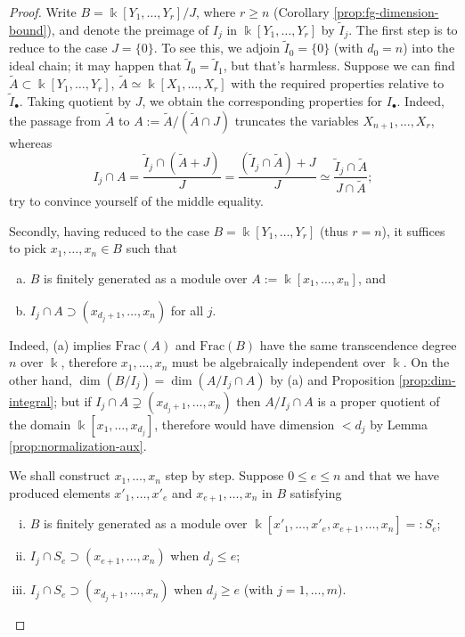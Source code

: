 \begin{proof}
	Write $B = \Bbbk[Y_1, \ldots, Y_r]/J$, where $r \geq n$ (Corollary \ref{prop:fg-dimension-bound}), and denote the preimage of $I_j$ in $\Bbbk[Y_1, \ldots, Y_r]$ by $\tilde{I}_j$. The first step is to reduce to the case $J=\{0\}$. To see this, we adjoin $\tilde{I}_0 = \{0\}$ (with $d_0 = n$) into the ideal chain; it may happen that $\tilde{I}_0 = \tilde{I}_1$, but that's harmless. Suppose we can find $\tilde{A} \subset \Bbbk[Y_1, \ldots, Y_r]$, $\tilde{A} \simeq \Bbbk[X_1, \ldots, X_r]$ with the required properties relative to $\tilde{I}_\bullet$. Taking quotient by $J$, we obtain the corresponding properties for $I_\bullet$. Indeed, the passage from $\tilde{A}$ to $A := \tilde{A}/(\tilde{A} \cap J)$ truncates the variables $X_{n + 1}, \ldots, X_r$, whereas
	\[ I_j \cap A = \frac{\tilde{I}_j \cap (\tilde{A} + J)}{J} = \frac{(\tilde{I}_j \cap \tilde{A}) + J}{J}  \simeq \frac{\tilde{I}_j \cap \tilde{A}}{J \cap \tilde{A}}; \]
	try to convince yourself of the middle equality.

	Secondly, having reduced to the case $B = \Bbbk[Y_1, \ldots, Y_r]$ (thus $r = n$), it suffices to pick $x_1, \ldots, x_n \in B$ such that
	\begin{enumerate}[(a)]
		\item $B$ is finitely generated as a module over $A := \Bbbk[x_1, \ldots, x_n]$, and
		\item $I_j \cap A \supset (x_{d_j+1}, \ldots, x_n)$ for all $j$.
	\end{enumerate}
	Indeed, (a) implies $\mathrm{Frac}(A)$ and $\mathrm{Frac}(B)$ have the same transcendence degree $n$ over $\Bbbk$, therefore $x_1, \ldots, x_n$ must be algebraically independent over $\Bbbk$. On the other hand, $\dim(B/I_j) = \dim(A/I_j \cap A)$ by (a) and Proposition \ref{prop:dim-integral}; but if $I_j \cap A \supsetneq (x_{d_j+1}, \ldots, x_n)$ then $A/I_j \cap A$ is a proper quotient of the domain $\Bbbk[x_1, \ldots, x_{d_j}]$, therefore would have dimension $< d_j$ by Lemma \ref{prop:normalization-aux}.
	
	We shall construct $x_1, \ldots, x_n$ step by step. Suppose $0 \leq e \leq n$ and that we have produced elements $x'_1, \ldots, x'_e$ and $x_{e+1}, \ldots, x_n$ in $B$ satisfying
	\begin{enumerate}[(i)]
		\item $B$ is finitely generated as a module over $\Bbbk[x'_1, \ldots, x'_e, x_{e+1}, \ldots, x_n] =: S_e$;
		\item $I_j \cap S_e \supset (x_{e+1}, \ldots, x_n)$ when $d_j \leq e$;
		\item $I_j \cap S_e \supset (x_{d_j + 1}, \ldots, x_n)$ when $d_j \geq e$ (with $j = 1, \ldots, m$).
	\end{enumerate}


\end{proof}
